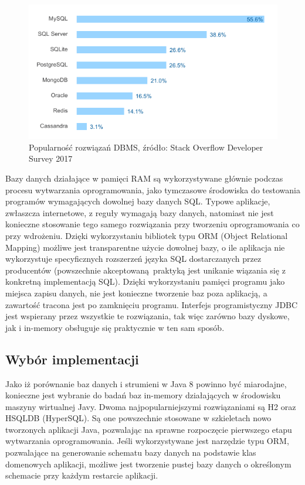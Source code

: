 \documentclass[12pt]{extarticle}
\begin{document}
\begin{figure}
\centering
\includegraphics{dbstats.png}
\caption{Popularność rozwiązań DBMS, źródło: Stack Overflow Developer Survey 2017}
\label{fig:dbstats}
\end{figure}

      Bazy danych działające w pamięci RAM są wykorzystywane głównie podczas procesu wytwarzania oprogramowania, jako tymczasowe środowiska do testowania programów wymagających dowolnej bazy danych SQL. Typowe aplikacje, zwłaszcza internetowe, z reguły wymagają bazy danych, natomiast nie jest konieczne stosowanie tego samego rozwiązania przy tworzeniu oprogramowania co przy wdrożeniu. Dzięki wykorzystaniu bibliotek typu ORM (Object Relational Mapping) możliwe jest transparentne użycie dowolnej bazy, o ile aplikacja nie wykorzystuje specyficznych rozszerzeń języka SQL dostarczanych przez producentów (powszechnie akceptowaną praktyką jest unikanie wiązania się z konkretną implementacją SQL). Dzięki wykorzystaniu pamięci programu jako miejsca zapisu danych, nie jest konieczne tworzenie baz poza aplikacją, a zawartość tracona jest po zamknięciu programu.  Interfejs programistyczny JDBC jest wspierany przez wszystkie te rozwiązania, tak więc zarówno bazy dyskowe, jak i in-memory obsługuje się praktycznie w ten sam sposób. 

\subsection{Wybór implementacji}

    Jako iż porównanie baz danych i strumieni w Java 8 powinno być miarodajne, konieczne jest wybranie do badań baz in-memory działających w środowisku maszyny wirtualnej Javy. Dwoma najpopularniejszymi rozwiązaniami są H2 oraz HSQLDB (HyperSQL). Są one powszechnie stosowane w szkieletach nowo tworzonych aplikacji Java, pozwalając na sprawne rozpoczęcie pierwszego etapu wytwarzania oprogramowania. Jeśli wykorzystywane jest narzędzie typu ORM, pozwalające na generowanie schematu bazy danych na podstawie klas domenowych aplikacji, możliwe jest tworzenie pustej bazy danych o określonym schemacie przy każdym restarcie aplikacji. 
    
\end{document}
